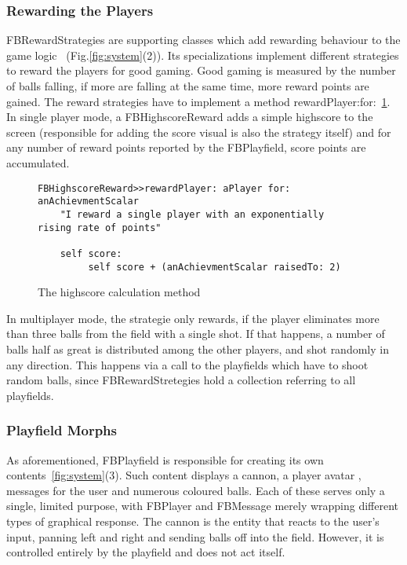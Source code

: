 \subsubsection{Rewarding the Players}
FBRewardStrategies are supporting classes which add rewarding behaviour 
to the game logic
~(Fig.\ref{fig:system}(2)). Its specializations 
implement different strategies to
reward the players for good gaming. Good gaming is measured by the 
number of balls falling, if more are falling at the same time, more 
reward points are gained.
The reward strategies have to implement a method
rewardPlayer:for:~\ref{lst:reward}.\\
In single player mode, a FBHighscoreReward
adds a simple highscore to the screen (responsible for adding the 
score visual is also the strategy itself) and for any number of 
reward points reported by the FBPlayfield, score points are accumulated.
%
\begin{figure}
  \begin{center}
    \begin{lstlisting}
FBHighscoreReward>>rewardPlayer: aPlayer for: anAchievmentScalar
    "I reward a single player with an exponentially 
rising rate of points" 

    self score:
         self score + (anAchievmentScalar raisedTo: 2)
    \end{lstlisting}
  \end{center}
  \caption{The highscore calculation method}
  \label{lst:reward}
\end{figure}
In multiplayer mode, the strategie only rewards, if the player eliminates 
more than three balls from the field with a single shot. If that happens, 
a number of balls half as great is distributed among the other players,
and shot randomly in any direction. This happens via a call to 
the playfields which have to shoot random balls, since FBRewardStretegies
hold a collection referring to all playfields.
%
\subsubsection{Playfield Morphs}
As aforementioned, FBPlayfield is responsible for creating its own 
contents~\ref{fig:system}(3). Such content displays a cannon, a 
player avatar , messages for the user and numerous coloured balls. 
Each of these serves only a single, limited purpose, with FBPlayer 
and FBMessage merely wrapping different types of graphical response.
The cannon is the entity that reacts to the user's input, panning 
left and right and sending balls off into the field. However, it 
is controlled entirely by the playfield and does not act itself.

